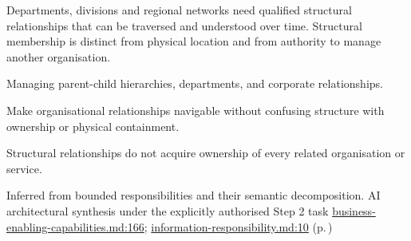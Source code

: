 Departments, divisions and regional networks need qualified structural relationships that can be traversed and understood over time. Structural membership is distinct from physical location and from authority to manage another organisation.



Managing parent-child hierarchies, departments, and corporate relationships.



Make organisational relationships navigable without confusing structure with ownership or physical containment.



Structural relationships do not acquire ownership of every related organisation or service.


Inferred from bounded responsibilities and their semantic decomposition. AI architectural synthesis under the explicitly authorised Step 2 task \hyperref[evidence:e01893359d483acf]{business-enabling-capabilities.md:166}; \hyperref[evidence:be61392fefb4bb10]{information-responsibility.md:10}
 (p.\,\pageref{cap:bec-healthcare-organisation})
